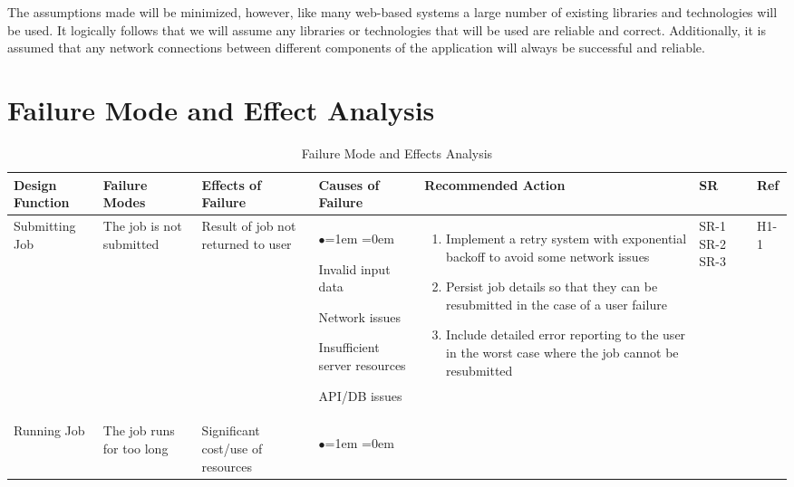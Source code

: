 \documentclass{article}
\begin{document}
The assumptions made will be minimized, however, like many web-based systems a large number of existing libraries and technologies will be used. It logically follows that we will assume any libraries or technologies that will be used are reliable and correct. Additionally, it is assumed that any network connections between different components of the application will always be successful and reliable.

\section{Failure Mode and Effect Analysis}

\begin{table}[H]
    \centering
    \caption{Failure Mode and Effects Analysis} \label{TblFMEA}
    \begin{tabularx}{\textwidth}{|P{2cm}|P{2cm}|P{2cm}|P{2cm}|P{3.45cm}|P{1cm}|P{1cm}|}
        \hline
        Design Function & Failure Modes & Effects of Failure & Causes of Failure & Recommended Action & SR & Ref\\
        \hline
        Submitting Job & The job is not submitted & Result of job not returned to user & 
        \begin{list}{$\bullet$}{\leftmargin=1em \itemindent=0em}
            \item Invalid input data
            \item Network issues
            \item Insufficient server resources
            \item API/DB issues
        \end{list}
        &
        \begin{enumerate}[label=(\alph*)]{\leftmargin=1em \itemindent=0em}
            \item Implement a retry system with exponential backoff to avoid some network issues
            \item Persist job details so that they can be resubmitted in the case of a user failure
            \item Include detailed error reporting to the user in the worst case where the job cannot be resubmitted
        \end{enumerate}
        & SR-1 SR-2 SR-3 & H1-1\\
        \hline
        Running Job & The job runs for too long & Significant cost/use of resources & 
        \begin{list}{$\bullet$}{\leftmargin=1em \itemindent=0em}

\end{list}
\end{tabularx}
\end{table}
\end{document}
